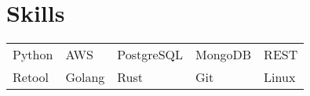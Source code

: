 \documentclass[a4paper,12pt]{article}
\begin{document}
\section{Skills}
\begin{tabularx}{\linewidth}{@{}l X@{} X@{} X@{} @{}l}
Python & AWS & PostgreSQL & MongoDB & REST \\
Retool & Golang & Rust & Git & Linux \\
\end{tabularx}

\vfill
{}
\end{document}
